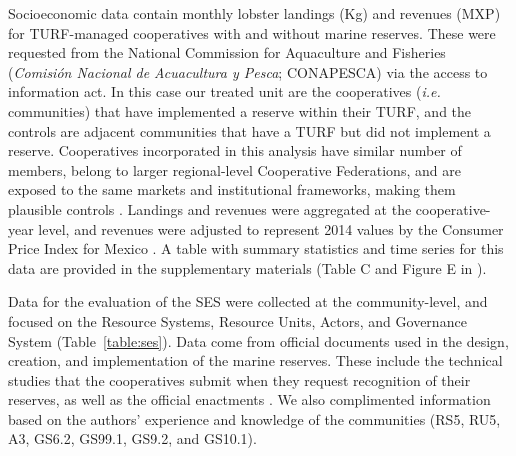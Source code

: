 \documentclass[10pt,letterpaper]{article}
\providecommand{\DIFaddtex}[1]{{\protect\color{blue}\uwave{#1}}} %
\providecommand{\DIFaddbegin}{} %
\providecommand{\DIFaddend}{} %
\providecommand{\DIFadd}[1]{\texorpdfstring{\DIFaddtex{#1}}{#1}} %
\newcommand{\DIFaddincludegraphics}[2][]{{\color{blue}\fbox{\DIFOincludegraphics[#1]{#2}}}} %
\DeclareRobustCommand{\DIFaddbegin}{\DIFOaddbegin \let\includegraphics\DIFaddincludegraphics} %
\DeclareRobustCommand{\DIFaddend}{\DIFOaddend \let\includegraphics\DIFOincludegraphics} %
\begin{document}
Socioeconomic data contain monthly lobster landings (Kg) and revenues (\DIFaddbegin \DIFadd{in Mexican Pesos; }\DIFaddend MXP) for TURF-managed cooperatives with and without marine reserves. These were requested from the National Commission for Aquaculture and Fisheries (\emph{Comisión Nacional de Acuacultura y Pesca}; CONAPESCA) via the access to information act. In this case our treated unit are the cooperatives (\emph{i.e.} communities) that have implemented a reserve within their TURF, and the controls are adjacent communities that have a TURF but did not implement a reserve. Cooperatives incorporated in this analysis have similar number of members, belong to larger regional-level Cooperative Federations, and are exposed to the same markets and institutional frameworks, making them plausible controls \cite{mccay_2014,mccay_2017,ayer_2018}. Landings and revenues were aggregated at the cooperative-year level, and revenues were adjusted to represent 2014 values by the Consumer Price Index for Mexico \cite{oecd_2017}. A table with summary statistics and time series for this data are provided in the supplementary materials (Table C and Figure E in ).

Data for the evaluation of the SES were collected at the community-level, and focused on the Resource Systems, Resource Units, Actors, and Governance System (Table~\ref{table:ses}). Data come from official documents used in the design, creation, and implementation of the marine reserves. These include the technical studies that the cooperatives submit when they request recognition of their reserves, as well as the official enactments \cite{dof_website_2012,dof_website_2013,dof_website_2018}. We also complimented information based on the authors' experience and knowledge of the communities (RS5, RU5, A3, GS6.2, GS99.1, GS9.2, and GS10.1).
\end{document}
